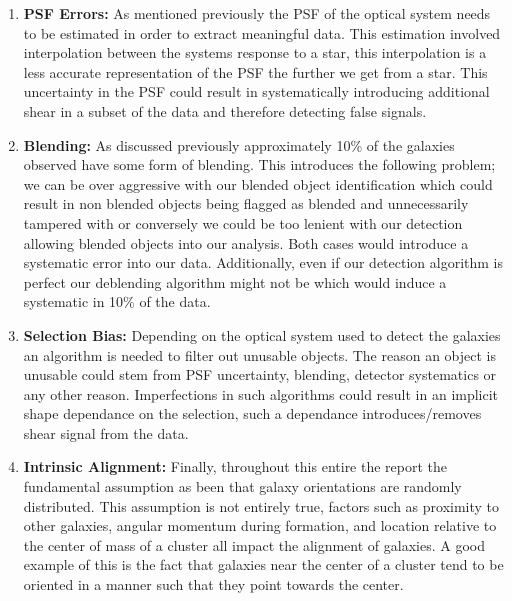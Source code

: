 \begin{enumerate}
    \item \textbf{PSF Errors:} As mentioned previously the PSF of the optical system needs to be estimated in order to extract meaningful data. This estimation involved interpolation between the systems response to a star, this interpolation is a less accurate representation of the PSF the further we get from a star. This uncertainty in the PSF could result in systematically introducing additional shear in a subset of the data and therefore detecting false signals. 
    \item \textbf{Blending:} As discussed previously approximately 10\% of the galaxies observed have some form of blending. This introduces the following problem; we can be over aggressive with our blended object identification which could result in non blended objects being flagged as blended and unnecessarily tampered with or conversely we could be too lenient with our detection allowing blended objects into our analysis. Both cases would introduce a systematic error into our data. Additionally, even if our detection algorithm is perfect our deblending algorithm might not be which would induce a systematic in 10\% of the data.
    \item \textbf{Selection Bias:} Depending on the optical system used to detect the galaxies an algorithm is needed to filter out unusable objects. The reason an object is unusable could stem from PSF uncertainty, blending, detector systematics or any other reason. Imperfections in such algorithms could result in an implicit shape dependance on the selection, such a dependance introduces/removes shear signal from the data.
    \item \textbf{Intrinsic Alignment:} Finally, throughout this entire the report the fundamental assumption as been that galaxy orientations are randomly distributed. This assumption is not entirely true, factors such as proximity to other galaxies, angular momentum during formation, and location relative to the center of mass of a cluster all impact the alignment of galaxies. A good example of this is the fact that galaxies near the center of a cluster tend to be oriented in a manner such that they point towards the center\cite{rachel_2018}.
\end{enumerate}

